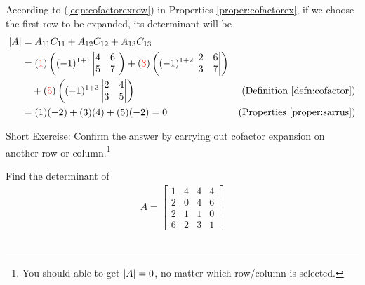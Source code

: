 \begin{solution}
According to (\ref{eqn:cofactorexrow}) in Properties \ref{proper:cofactorex}, if we choose the first row to be expanded, its determinant will be
\begin{align*}
|A| &= A_{11}C_{11} + A_{12}C_{12} + A_{13}C_{13} \\
&= (\textcolor{red}{1})\left((-1)^{1+1}
\begin{vmatrix}
4 & 6 \\
5 & 7
\end{vmatrix}\right)
+
(\textcolor{red}{3})\left((-1)^{1+2}
\begin{vmatrix}
2 & 6 \\
3 & 7
\end{vmatrix}\right) \\
& \quad + 
(\textcolor{red}{5})\left((-1)^{1+3}
\begin{vmatrix}
2 & 4 \\
3 & 5
\end{vmatrix}\right) & \text{(Definition \ref{defn:cofactor})}\\
&= (1)(-2) + (3)(4) + (5)(-2) = 0 & \text{(Properties \ref{proper:sarrus})} 
\end{align*}
\end{solution}
Short Exercise: Confirm the answer by carrying out cofactor expansion on another row or column.\footnote{You should able to get $\abs{A} = 0$, no matter which row/column is selected.}
\begin{exmp}
\label{exmp:4x4det}
Find the determinant of
\begin{align*}
A = 
\begin{bmatrix}
1 & 4 & 4 & 4 \\
2 & 0 & 4 & 6 \\
2 & 1 & 1 & 0 \\
6 & 2 & 3 & 1
\end{bmatrix}
\end{align*}\
\end{exmp}
